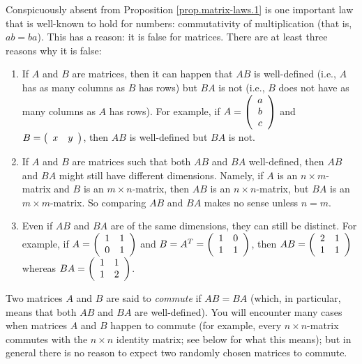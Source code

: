 \documentclass[numbers=enddot,12pt,final,onecolumn,notitlepage]{scrartcl}%
\theoremstyle{definition}
\begin{document}
Conspicuously absent from Proposition \ref{prop.matrix-laws.1} is one
important law that is well-known to hold for numbers: commutativity of
multiplication (that is, $ab=ba$). This has a reason: it is false for
matrices. There are at least three reasons why it is false:

\begin{enumerate}
\item If $A$ and $B$ are matrices, then it can happen that $AB$ is
well-defined (i.e., $A$ has as many columns as $B$ has rows) but $BA$ is not
(i.e., $B$ does not have as many columns as $A$ has rows). For example, if
$A=\left(
\begin{array}
[c]{c}%
a\\
b\\
c
\end{array}
\right)  $ and $B=\left(
\begin{array}
[c]{cc}%
x & y
\end{array}
\right)  $, then $AB$ is well-defined but $BA$ is not.

\item If $A$ and $B$ are matrices such that both $AB$ and $BA$ well-defined,
then $AB$ and $BA$ might still have different dimensions. Namely, if $A$ is an
$n\times m$-matrix and $B$ is an $m\times n$-matrix, then $AB$ is an $n\times
n$-matrix, but $BA$ is an $m\times m$-matrix. So comparing $AB$ and $BA$ makes
no sense unless $n=m$.

\item Even if $AB$ and $BA$ are of the same dimensions, they can still be
distinct. For example, if $A=\left(
\begin{array}
[c]{cc}%
1 & 1\\
0 & 1
\end{array}
\right)  $ and $B=A^{T}=\left(
\begin{array}
[c]{cc}%
1 & 0\\
1 & 1
\end{array}
\right)  $, then $AB=\left(
\begin{array}
[c]{cc}%
2 & 1\\
1 & 1
\end{array}
\right)  $ whereas $BA=\left(
\begin{array}
[c]{cc}%
1 & 1\\
1 & 2
\end{array}
\right)  $.
\end{enumerate}

Two matrices $A$ and $B$ are said to \textit{commute} if $AB=BA$ (which, in
particular, means that both $AB$ and $BA$ are well-defined). You will
encounter many cases when matrices $A$ and $B$ happen to commute (for example,
every $n\times n$-matrix commutes with the $n\times n$ identity matrix; see
below for what this means); but in general there is no reason to expect two
randomly chosen matrices to commute.
\end{document}
